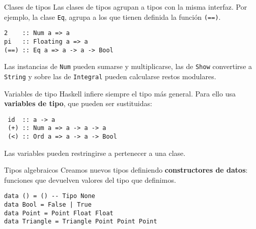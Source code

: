 \begin{frame}[fragile]{Clases de tipos}
Las clases de tipos agrupan a tipos con la misma interfaz.
Por ejemplo, la clase \texttt{Eq}, agrupa a los que tienen
definida la función \texttt{(==)}.

\espacio

\begin{lstlisting}
2    :: Num a => a
pi   :: Floating a => a
(==) :: Eq a => a -> a -> Bool
\end{lstlisting}

\espacio

Las instancias de \texttt{Num} pueden sumarse y multiplicarse,
las de \texttt{Show} convertirse a \texttt{String}
y sobre las de \texttt{Integral} pueden calcularse restos modulares.
\end{frame}

\begin{frame}[fragile]{Variables de tipo}
  Haskell infiere siempre el tipo más general.
  Para ello usa \textbf{variables de tipo}, que pueden ser sustituidas:

  \espacio

  \begin{lstlisting}
 id  :: a -> a
 (+) :: Num a => a -> a -> a
 (<) :: Ord a => a -> a -> Bool
  \end{lstlisting}

  \espacio

  Las variables pueden restringirse a pertenecer a una clase.


\end{frame}

\begin{frame}[fragile]{Tipos algebraicos}
  Creamos nuevos tipos definiendo \textbf{constructores de datos}: funciones que
  devuelven valores del tipo que definimos.

  \espacio

  \begin{lstlisting}
data () = () -- Tipo None
data Bool = False | True
data Point = Point Float Float
data Triangle = Triangle Point Point Point
  \end{lstlisting}

\end{frame}

